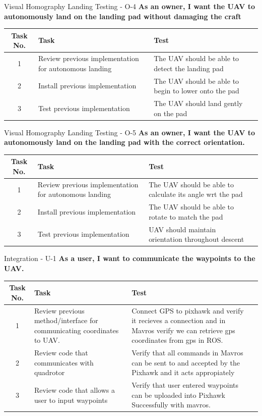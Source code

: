 \documentclass[11pt]{beamer}
\begin{document}
\begin{frame}{Visual Homography Landing Testing - O-4}
	\textbf{As an owner, I want the UAV to autonomously land on the landing pad without damaging the craft}
	\begin{tabular}{| c | >{\raggedright}m{4cm} | m{4cm} | m{4cm} |}\hline
		Task No. & Task & Test \\\hline
		1 & Review previous implementation for autonomous landing & The UAV should be able to detect the landing pad\\\hline
		2 & Install previous implementation & The UAV should be able to begin to lower onto the pad\\\hline
		3 & Test previous implementation & The UAV should land gently on the pad\\\hline
		
	\end{tabular}
\end{frame}
\begin{frame}{Visual Homography Landing Testing - O-5}
\textbf{As an owner, I want the UAV to autonomously land on the landing pad with the correct orientation.}
\begin{tabular}{| c | >{\raggedright}m{4cm} | m{4cm} | m{4cm} |}\hline
	Task No. & Task & Test\\\hline
	1 & Review previous implementation for autonomous landing & The UAV should be able to calculate its angle wrt the pad\\\hline
	2 & Install previous implementation & The UAV should be able to rotate to match the pad\\\hline
	3 & Test previous implementation & UAV should maintain orientation throughout descent \\\hline
\end{tabular}
\end{frame}

\begin{frame}{Integration - U-1}
\textbf{As a user, I want to communicate the waypoints to the UAV.}
\begin{tabular}{| c | >{\raggedright}m{4cm} | m{4cm} | c |}\hline
	Task No. & Task & Test\\\hline
	1 & Review previous method/interface for communicating coordinates to UAV. & Connect GPS to pixhawk and verify it recieves a connection and in Mavros verify we can retrieve gps coordinates from gps in ROS.  \\\hline
	2 & Review code that communicates with quadrotor & Verify that all commands in Mavros can be sent to and accepted by the Pixhawk and it acts appropiately \\\hline
	3 & Review code that allows a user to input waypoints & Verify that user entered waypoints can be uploaded into Pixhawk Successfully with mavros.\\\hline
	
\end{tabular}
\end{frame}
\end{document}
